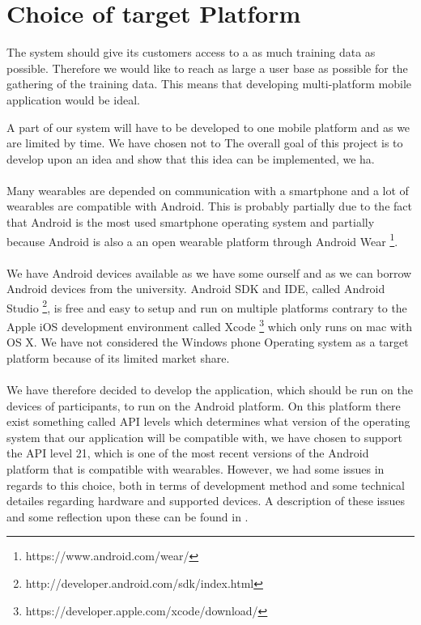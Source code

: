 
\section{Choice of target Platform}
\label{sec:choice_of_platform}

The system should give its customers access to a as much training data as possible. Therefore we would like to reach as large a user base as possible for the gathering of the training data. This means that developing multi-platform mobile application would be ideal. 

A part of our system will have to be developed to one mobile platform and as we are limited by time. We have chosen not to  The overall goal of this project is to develop upon an idea and show that this idea can be implemented, we ha. 
\\\\
Many wearables are depended on communication with a smartphone and a lot of wearables are compatible with Android. This is probably partially due to the fact that Android is the most used smartphone operating system \parencite{android_os_market_share} and partially because Android is also a an open wearable platform through Android Wear \footnote{https://www.android.com/wear/}.
\\\\
We have Android devices available as we have some ourself and as we can borrow Android devices from the university. Android SDK and IDE, called Android Studio \footnote{http://developer.android.com/sdk/index.html}, is free and easy to setup and run on multiple platforms contrary to the Apple iOS development environment called Xcode \footnote{https://developer.apple.com/xcode/download/} which only runs on mac with OS X. We have not considered the Windows phone Operating system as a target platform because of its limited market share.
\\\\
We have therefore decided to develop the application, which should be run on the devices of participants, to run on the Android platform. On this platform there exist something called API levels which determines what version of the operating system that our application will be compatible with, we have chosen to support the API level 21, which is one of the most recent versions of the Android platform that is compatible with wearables. However, we had some issues in regards to this choice, both in terms of development method and some technical detailes regarding hardware and supported devices. A description of these issues and some reflection upon these can be found in .
